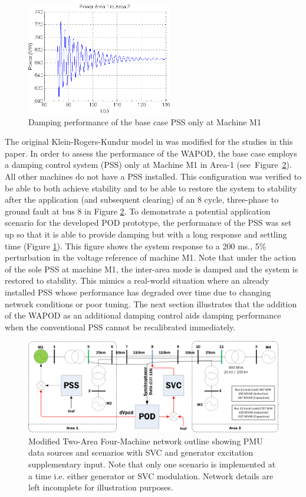 \documentclass[journal]{IEEEtran}
\begin{document}
\begin{figure}[!t]
\centering
\includegraphics[width=2.5in]{PSS_degraded_performance.png}
\caption{Damping performance of the base case PSS only at Machine M1}
\label{PSS_Degrade}
\end{figure}

The original Klein-Rogers-Kundur model in \cite{KundurTwoArea} was modified for the studies in this paper. In order to assess the performance of the WAPOD, the base case employs a damping control system (PSS) only at Machine M1 in Area-1 (see~Figure~\ref{NetworkOutline}). All other machines do not have a PSS installed. This configuration was  verified to be able to both achieve stability and to be able to restore the system to stability after the application (and subsequent clearing) of an 8 cycle, three-phase to ground fault at bus 8 in Figure \ref{NetworkOutline}. To demonstrate a potential application scenario for the developed POD prototype, the performance of the PSS was set up so that it is able to provide damping but with a long response and settling time (Figure \ref{PSS_Degrade}). This figure shows the system response to a 200 ms., 5\% perturbation in the voltage reference of machine M1. Note that under the action of the sole PSS at machine M1, the inter-area mode is damped and the system is restored to stability. This mimics a real-world situation where an already installed PSS whose performance has degraded over time due to changing network conditions or poor tuning. The next section illustrates that the addition of the WAPOD as an additional damping control aids damping performance when the conventional PSS cannot be recalibrated immediately.

\begin{figure}[!th]
\centering
\includegraphics[width=5.5in]{Kundur2Area_outline_multi.png}
\caption{Modified Two-Area Four-Machine network outline showing PMU data sources and scenarios with SVC and generator excitation supplementary input. Note that only one scenario is implemented at a time i.e. either generator or SVC modulation. Network details are left incomplete for illustration purposes.}
\label{NetworkOutline}
\end{figure}
\end{document}
